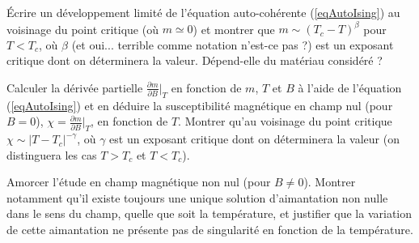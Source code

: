 \question
\'Ecrire un développement limité de l'équation auto-cohérente (\ref{eqAutoIsing}) au voisinage du point critique (où $m \simeq 0$) et montrer que $m\sim (T_c-T)^{\beta}$ pour $T<T_c$, où $\beta$ (et oui... terrible comme notation n'est-ce pas ?) est un exposant critique dont on déterminera la valeur. Dépend-elle du matériau considéré ?  

\question
Calculer la dérivée partielle $\displaystyle \frac{\partial m}{\partial B}\Big|_{T}$ en fonction de $m$, $T$ et $B$ à l'aide de l'équation (\ref{eqAutoIsing}) et en déduire la susceptibilité magnétique en champ nul (pour $B=0$), $\displaystyle \chi=\frac{\partial m}{\partial B}\Big|_{T}$, en fonction de $T$. Montrer qu'au voisinage du point critique $\chi \sim |T-T_c|^{-\gamma}$, où $\gamma$ est un exposant critique dont on déterminera la valeur (on distinguera les cas $T>T_c$ et $T<T_c$). 

\question
Amorcer l'étude en champ magnétique non nul (pour $B \ne 0$). Montrer notamment qu'il existe toujours une unique solution d'aimantation non nulle dans le sens du champ, quelle que soit la température, et justifier que la variation de cette aimantation ne présente pas de singularité en fonction de la température. 

